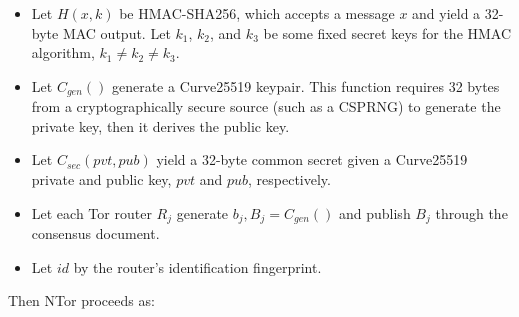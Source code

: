 \begin{itemize}
	\item Let $ H(x,k) $ be HMAC-SHA256, which accepts a message $ x $ and yield a 32-byte MAC output. Let $ k_{1} $, $ k_{2} $, and $ k_{3} $ be some fixed secret keys for the HMAC algorithm, $ k_{1} \neq k_{2} \neq k_{3} $.
	\item Let $ \mathit{C}_{\mathit{gen}}() $ generate a Curve25519 keypair. This function requires 32 bytes from a cryptographically secure source (such as a CSPRNG) to generate the private key, then it derives the public key.
	\item Let $ \mathit{C}_{\mathit{sec}}(pvt, pub) $ yield a 32-byte common secret given a Curve25519 private and public key, $ pvt $ and $ pub $, respectively.
	\item Let each Tor router $ R_{j} $ generate $ b_{j},B_{j} = \mathit{C}_{\mathit{gen}}() $ and publish $ B_{j} $ through the consensus document.
	\item Let $ \mathit{id} $ by the router's identification fingerprint.
\end{itemize}

Then NTor proceeds as:

